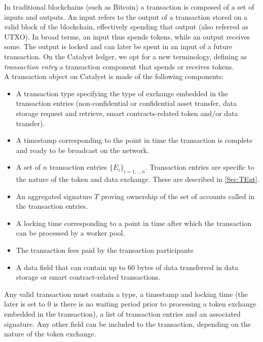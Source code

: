 In traditional blockchains (such as Bitcoin) a transaction is composed of a set of inputs and outputs. An input refers to the output of a transaction stored on a valid block of the blockchain, effectively spending that output (also referred as UTXO). In broad terms, an input thus spends tokens, while an output receives some. The output is locked and can later be spent in an input of a future transaction. On the Catalyst ledger, we opt for a new terminology, defining as \textit{transaction entry} a transaction component that spends or receives tokens.\\

A transaction object on Catalyst is made of the following components:

\begin{itemize}
\item A transaction type specifying the type of exchange embedded in the transaction entries (non-confidential or confidential asset transfer, data storage request and retrieve, smart contracts-related token and/or data transfer).      
\item A timestamp corresponding to the point in time the transaction is complete and ready to be broadcast on the network.
\item A set of $n$ transaction entries $\{E_i\}_{i=1,..,n}$. Transaction entries are specific to the nature of the token and data exchange. These are described in \ref{Sec:TEnt}.
\item An aggregated signature $T$ proving ownership of the set of accounts called in the transaction entries.
\item A locking time corresponding to a point in time after which the transaction can be processed by a worker pool.
\item The transaction fees paid by the transaction participants
\item A data field that can contain up to 60 bytes of data transferred in data storage or smart contract-related transactions. 
\end{itemize}

Any valid transaction must contain a type, a timestamp and locking time (the later is set to 0 is there is no waiting period prior to processing a token exchange embedded in the transaction), a list of transaction entries and an associated signature. Any other field can be included to the transaction, depending on the nature of the token exchange. 